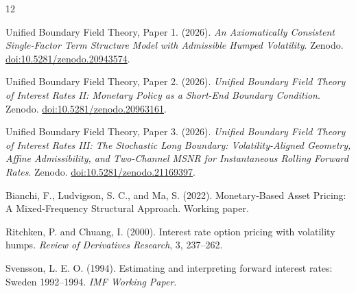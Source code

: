 \documentclass[11pt]{article}
\begin{document}
\begin{thebibliography}{12}


Unified Boundary Field Theory, Paper 1. (2026).
\emph{An Axiomatically Consistent Single-Factor Term Structure Model with Admissible Humped Volatility}.
Zenodo. \href{https://doi.org/10.5281/zenodo.20943574}{doi:10.5281/zenodo.20943574}.

Unified Boundary Field Theory, Paper 2. (2026).
\emph{Unified Boundary Field Theory of Interest Rates II: Monetary Policy as a Short-End Boundary Condition}.
Zenodo. \href{https://doi.org/10.5281/zenodo.20963161}{doi:10.5281/zenodo.20963161}.

Unified Boundary Field Theory, Paper 3. (2026).
\emph{Unified Boundary Field Theory of Interest Rates III: The Stochastic Long Boundary: Volatility-Aligned Geometry, Affine Admissibility, and Two-Channel MSNR for Instantaneous Rolling Forward Rates}.
Zenodo. \href{https://doi.org/10.5281/zenodo.21169397}{doi:10.5281/zenodo.21169397}.

Bianchi, F., Ludvigson, S. C., and Ma, S. (2022).
Monetary-Based Asset Pricing: A Mixed-Frequency Structural Approach.
Working paper.

Ritchken, P. and Chuang, I. (2000).
Interest rate option pricing with volatility humps.
\emph{Review of Derivatives Research}, 3, 237--262.

Svensson, L. E. O. (1994).
Estimating and interpreting forward interest rates: Sweden 1992--1994.
\emph{IMF Working Paper}.

\end{thebibliography}
\end{document}
